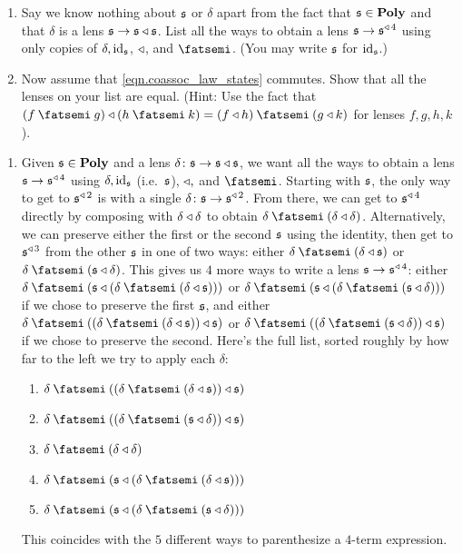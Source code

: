 \documentclass[Book-Poly]{subfiles}
\begin{document}
\begin{exercise}
\begin{enumerate}
    \item Say we know nothing about $\mathfrak{s}$ or $\delta$ apart from the fact that $\mathfrak{s}\in\mathbf{Poly}$ and that $\delta$ is a lens $\mathfrak{s}\to\mathfrak{s}\mathbin{\triangleleft}\mathfrak{s}$.
    List all the ways to obtain a lens $\mathfrak{s}\to\mathfrak{s}^{\mathbin{\triangleleft}\,4}$ using only copies of $\delta,\mathrm{id}_{\mathfrak{s}}$, $\mathbin{\triangleleft}$, and $\then$.
    (You may write $\mathfrak{s}$ for $\mathrm{id}_{\mathfrak{s}}$.)

    \item Now assume that \eqref{eqn.coassoc_law_states} commutes.
    Show that all the lenses on your list are equal.
    (Hint: Use the fact that $(f\then g)\tri(h\then k)=(f\tri h)\then(g\tri k)$ for lenses $f,g,h,k$).
    \qedhere
\end{enumerate}
\begin{solution}
\begin{enumerate}
    \item Given $\mathfrak{s}\in\mathbf{Poly}$ and a lens $\delta\colon\mathfrak{s}\to\mathfrak{s}\mathbin{\triangleleft}\mathfrak{s}$, we want all the ways to obtain a lens $\mathfrak{s}\to\mathfrak{s}^{\mathbin{\triangleleft}\,4}$ using $\delta,\mathrm{id}_{\mathfrak{s}}$ (i.e.\ $\mathfrak{s}$), $\mathbin{\triangleleft},$ and $\then$.
    Starting with $\mathfrak{s}$, the only way to get to $\mathfrak{s}^{\mathbin{\triangleleft}\,2}$ is with a single $\delta\colon\mathfrak{s}\to\mathfrak{s}^{\mathbin{\triangleleft}\,2}$.
    From there, we can get to $\mathfrak{s}^{\mathbin{\triangleleft}\,4}$ directly by composing with $\delta\mathbin{\triangleleft}\delta$ to obtain $\delta\then(\delta\tri\delta)$.
    Alternatively, we can preserve either the first or the second $\mathfrak{s}$ using the identity, then get to $\mathfrak{s}^{\mathbin{\triangleleft}\,3}$ from the other $\mathfrak{s}$ in one of two ways: either $\delta\then(\delta\tri\car{s})$ or $\delta\then(\car{s}\tri\delta)$.
    This gives us $4$ more ways to write a lens $\mathfrak{s}\to\mathfrak{s}^{\mathbin{\triangleleft}\,4}$: either $\delta\then(\car{s}\tri(\delta\then(\delta\tri\car{s})))$ or $\delta\then(\car{s}\tri(\delta\then(\car{s}\tri\delta)))$ if we chose to preserve the first $\mathfrak{s}$, and either $\delta\then((\delta\then(\delta\tri\car{s}))\tri\car{s})$ or $\delta\then((\delta\then(\car{s}\tri\delta))\tri\car{s})$ if we chose to preserve the second.
    Here's the full list, sorted roughly by how far to the left we try to apply each $\delta$:
    \begin{enumerate}[label=(\arabic*)]
        \item $\delta\then((\delta\then(\delta\tri\car{s}))\tri\car{s})$
        \item $\delta\then((\delta\then(\car{s}\tri\delta))\tri\car{s})$
        \item $\delta\then(\delta\tri\delta)$
        \item $\delta\then(\car{s}\tri(\delta\then(\delta\tri\car{s})))$
        \item $\delta\then(\car{s}\tri(\delta\then(\car{s}\tri\delta)))$
    \end{enumerate}
    This coincides with the $5$ different ways to parenthesize a $4$-term expression.
    

\end{enumerate}
\end{solution}
\end{exercise}
\end{document}

